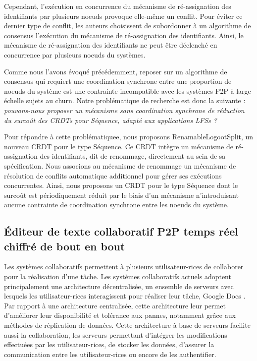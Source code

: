 Cependant, l'exécution en concurrence du mécanisme de ré-assignation des identifiants par plusieurs noeuds provoque elle-même un conflit.
Pour éviter ce dernier type de conflit, les auteurs choisissent de subordonner à un algorithme de consensus l'exécution du mécanisme de ré-assignation des identifiants.
Ainsi, le mécanisme de ré-assignation des identifiants ne peut être déclenché en concurrence par plusieurs noeuds du systèmes.

Comme nous l'avons évoqué précédemment, reposer sur un algorithme de consensus qui requiert une coordination synchrone entre une proportion de noeuds du système est une contrainte incompatible avec les systèmes \ac{P2P} à large échelle sujets au churn.
Notre problématique de recherche est donc la suivante : \emph{pouvons-nous proposer un mécanisme sans coordination synchrone de réduction du surcoût des \acp{CRDT} pour Séquence, \ie adapté aux applications \acp{LFS} ?}

Pour répondre à cette problématiquee, nous proposons RenamableLogootSplit, un nouveau \ac{CRDT} pour le type Séquence.
Ce \ac{CRDT} intègre un mécanisme de ré-assignation des identifiants, dit de renommage, directement au sein de sa spécification.
Nous associons au mécanisme de renommage un mécanisme de résolution de conflits automatique additionnel pour gérer ses exécutions concurrentes.
Ainsi, nous proposons un \ac{CRDT} pour le type Séquence dont le surcoût est périodiquement réduit par le biais d'un mécanisme n'introduisant aucune contrainte de coordination synchrone entre les noeuds du système.

\subsection{Éditeur de texte collaboratif \ac{P2P} temps réel chiffré de bout en bout}
\label{sec:research-questions-mute}

Les systèmes collaboratifs permettent à plusieurs utilisateur-rices de collaborer pour la réalisation d'une tâche.
Les systèmes collaboratifs actuels adoptent principalement une architecture décentralisée, \ie un ensemble de serveurs avec lesquels les utilisateur-rices interagissent pour réaliser leur tâche, \eg Google Docs \cite{gdocs}.
Par rapport à une architecture centralisée, cette architecture leur permet d'améliorer leur disponibilité et tolérance aux pannes, notamment grâce aux méthodes de réplication de données.
Cette architecture à base de serveurs facilite aussi la collaboration, les serveurs permettant d'intégrer les modifications effectuées par les utilisateur-rices, de stocker les données, d'assurer la communication entre les utilisateur-rices ou encore de les authentifier.

